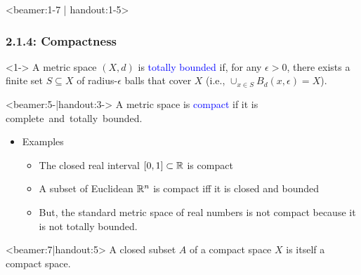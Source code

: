 \documentclass[10pt,english,aspectratio=169]{beamer}
\begin{document}
\begin{frame}<beamer:1-7 | handout:1-5>
\frametitle{2.1.4: Compactness}

\begin{definition}<1->
A metric space $(X,d)$ is \textcolor{blue}{totally bounded} if, for any $\epsilon > 0$, there exists a finite set $S \subseteq X$ of radius-$\epsilon$ balls that cover $X$ (i.e., $\cup_{x\in S} B_d (x,\epsilon) = X$).
\end{definition}

\begin{definition}<beamer:5-|handout:3->
A metric space is \textcolor{blue}{compact} if it is complete~and~totally~bounded.
\end{definition}

\begin{itemize}
\setlength\itemsep{3mm}
\item<beamer:6-|handout:4-> Examples \vspace{1mm}
\begin{itemize} 
  \setlength\itemsep{1.5mm}
  \item The closed real interval $[0,1]\subset \mathbb{R}$ is compact
  \item A subset of Euclidean $\mathbb{R}^n$ is compact iff it is closed and bounded
  \item But, the standard metric space of real numbers is not compact because it is not totally bounded.
\end{itemize}

\end{itemize}

\begin{theorem}<beamer:7|handout:5>
A closed subset $A$ of a compact space $X$ is itself a compact space.
\end{theorem}

\end{frame}
\end{document}
